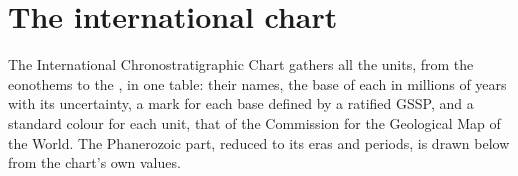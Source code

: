 \section{The international chart}\label{sec:b1:stratigraphic-scale:chart}

The International Chronostratigraphic Chart gathers all the units, from the
eonothems to the , in one table: their names, the base of each in millions
of years with its uncertainty, a mark for each base defined by a ratified GSSP,
and a standard colour for each unit, that of the Commission for the Geological
Map of the World. The
Phanerozoic part, reduced to its eras and periods, is drawn below from the
chart's own values.

